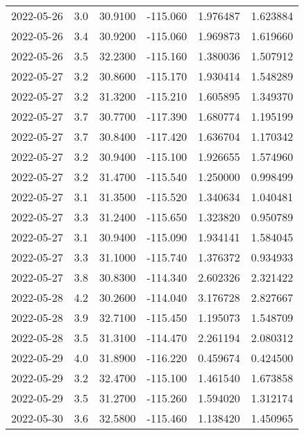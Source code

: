 \begin{tabular}{lrrrrr}
2022-05-26 &       3.0 &  30.9100 &  -115.060 &         1.976487 &         1.623884 \\
2022-05-26 &       3.4 &  30.9200 &  -115.060 &         1.969873 &         1.619660 \\
2022-05-26 &       3.5 &  32.2300 &  -115.160 &         1.380036 &         1.507912 \\
2022-05-27 &       3.2 &  30.8600 &  -115.170 &         1.930414 &         1.548289 \\
2022-05-27 &       3.2 &  31.3200 &  -115.210 &         1.605895 &         1.349370 \\
2022-05-27 &       3.7 &  30.7700 &  -117.390 &         1.680774 &         1.195199 \\
2022-05-27 &       3.7 &  30.8400 &  -117.420 &         1.636704 &         1.170342 \\
2022-05-27 &       3.2 &  30.9400 &  -115.100 &         1.926655 &         1.574960 \\
2022-05-27 &       3.2 &  31.4700 &  -115.540 &         1.250000 &         0.998499 \\
2022-05-27 &       3.1 &  31.3500 &  -115.520 &         1.340634 &         1.040481 \\
2022-05-27 &       3.3 &  31.2400 &  -115.650 &         1.323820 &         0.950789 \\
2022-05-27 &       3.1 &  30.9400 &  -115.090 &         1.934141 &         1.584045 \\
2022-05-27 &       3.3 &  31.1000 &  -115.740 &         1.376372 &         0.934933 \\
2022-05-27 &       3.8 &  30.8300 &  -114.340 &         2.602326 &         2.321422 \\
2022-05-28 &       4.2 &  30.2600 &  -114.040 &         3.176728 &         2.827667 \\
2022-05-28 &       3.9 &  32.7100 &  -115.450 &         1.195073 &         1.548709 \\
2022-05-28 &       3.5 &  31.3100 &  -114.470 &         2.261194 &         2.080312 \\
2022-05-29 &       4.0 &  31.8900 &  -116.220 &         0.459674 &         0.424500 \\
2022-05-29 &       3.2 &  32.4700 &  -115.100 &         1.461540 &         1.673858 \\
2022-05-29 &       3.5 &  31.2700 &  -115.260 &         1.594020 &         1.312174 \\
2022-05-30 &       3.6 &  32.5800 &  -115.460 &         1.138420 &         1.450965 \\

\end{tabular}
